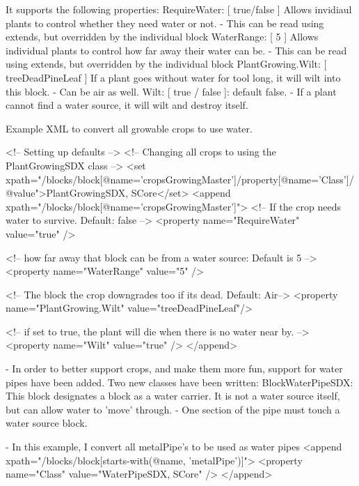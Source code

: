 \begin{DoxyVerb}[ Quests ]
        It supports the following properties:
            RequireWater: [ true/false ]
                Allows invidiaul plants to control whether they need water or not. 
                - This can be read using extends, but overridden by the individual block
            WaterRange: [ 5 ]
                Allows individual plants to control how far away their water can be.
                - This can be read using extends, but overridden by the individual block
            PlantGrowing.Wilt: [ treeDeadPineLeaf ]
                If a plant goes without water for tool long, it will wilt into this block.
                - Can be air as well.
            Wilt: [ true / false ]: default false.
                - If a plant cannot find a water source, it will wilt and destroy itself.

        Example XML to convert all growable crops to use water.

            <!-- Setting up defaults -->
            <!-- Changing all crops to using the PlantGrowingSDX class -->
            <set xpath="/blocks/block[@name='cropsGrowingMaster']/property[@name='Class']/@value">PlantGrowingSDX, SCore</set>
            <append xpath="/blocks/block[@name='cropsGrowingMaster']">
                <!-- If the crop needs water to survive. Default: false -->
                <property name="RequireWater" value="true" /> 

                <!-- how far away that block can be from a water source: Default is 5 -->
                <property name="WaterRange" value="5" />  

                <!-- The block the crop downgrades too if its dead. Default: Air-->
                <property name="PlantGrowing.Wilt" value="treeDeadPineLeaf"/>

                <!-- if set to true, the plant will die when there is no water near by. -->
                <property name="Wilt" value="true" />
            </append>

    - In order to better support crops, and make them more fun, support for water pipes have been added.
        Two new classes have been written:
            BlockWaterPipeSDX: This block designates a block as a water carrier. It is not a water source itself, but can allow water to 'move' through. 
                - One section of the pipe must touch a water source block.

                - In this example, I convert all metalPipe's to be used as water pipes
                    <append xpath="/blocks/block[starts-with(@name, 'metalPipe')]">
                        <property name="Class" value="WaterPipeSDX, SCore" />
                    </append>


\end{DoxyVerb}
